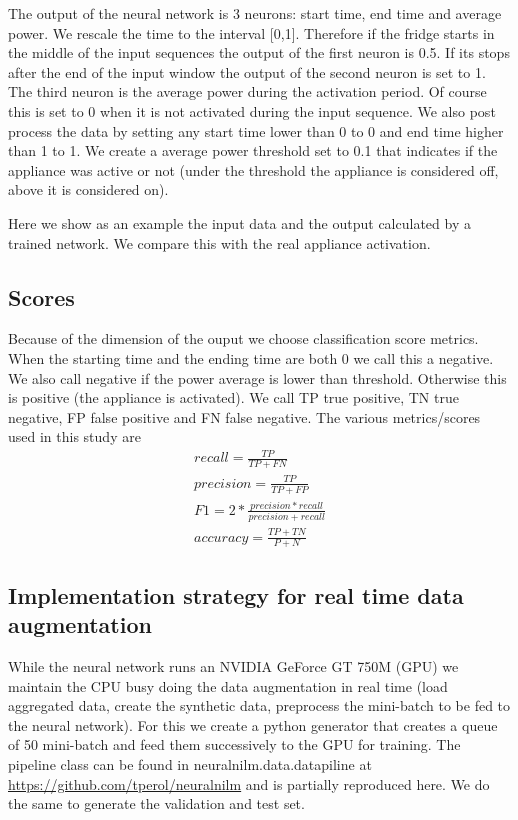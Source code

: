 \documentclass[11pt]{article}
\begin{document}
The output of the neural network is 3 neurons: start time, end time and average power. We rescale the time to the interval [0,1]. Therefore if the fridge starts in the middle of the input sequences the output of the first neuron is 0.5. If its stops after the end of the input window the output of the second neuron is set to 1. The third neuron is the average power during the activation period. Of course this is set to 0 when it is not activated during the input sequence. We also post process the data by setting any start time lower than 0 to 0 and end time higher than 1 to 1. We create a average power threshold set to 0.1 that indicates if the appliance was active or not (under the threshold the appliance is considered off, above it is considered on).

Here we show as an example the input data and the output calculated by a trained network. We compare this with the real appliance activation.

\subsection{Scores}

Because of the dimension of the ouput we choose classification score metrics. When the starting time and the ending time are both 0 we call this a negative. We also call negative if the power average is lower than threshold. Otherwise this is positive (the appliance is activated). We call TP true positive, TN true negative, FP false positive and FN false negative. The various metrics/scores used in this study are
\begin{eqnarray}
recall = \frac{TP}{TP + FN} \\
 precision = \frac{TP}{TP + FP} \\
 F1 = 2 * \frac{precision* recall}{precision + recall} \\
 accuracy = \frac{TP + TN}{P + N}
\end{eqnarray}


\subsection{Implementation strategy for real time data augmentation}
While the neural network runs an NVIDIA GeForce GT 750M (GPU) we maintain the CPU busy doing the data augmentation in real time (load aggregated data, create the synthetic data, preprocess the mini-batch to be fed to the neural network). For this we create a python generator that creates a queue of 50 mini-batch and feed them successively to the GPU for training.
The pipeline class can be found in neuralnilm.data.datapiline at \url{https://github.com/tperol/neuralnilm} and is partially reproduced here. We do the same to generate the validation and test set.
\end{document}
